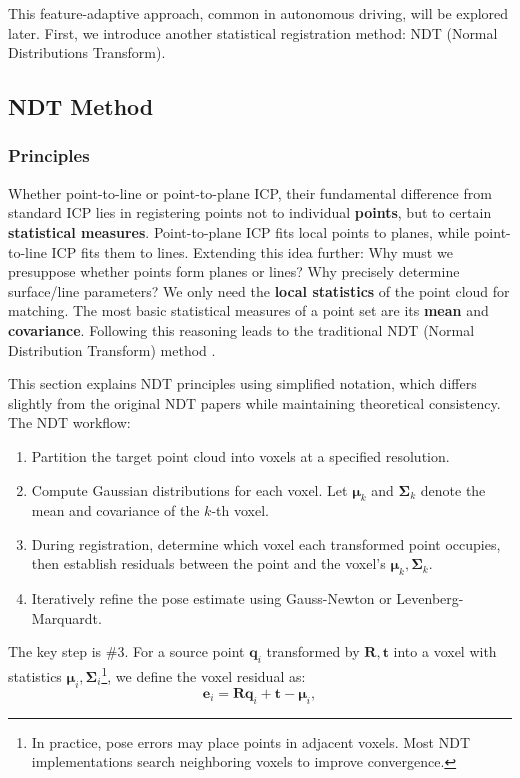 This feature-adaptive approach, common in autonomous driving, will be explored later. First, we introduce another statistical registration method: NDT (Normal Distributions Transform).

\subsection{NDT Method}
\label{sec:ndt}
\subsubsection{Principles}
Whether point-to-line or point-to-plane ICP, their fundamental difference from standard ICP lies in registering points not to individual \textbf{points}, but to certain \textbf{statistical measures}. Point-to-plane ICP fits local points to planes, while point-to-line ICP fits them to lines. Extending this idea further: Why must we presuppose whether points form planes or lines? Why precisely determine surface/line parameters? We only need the \textbf{local statistics} of the point cloud for matching. The most basic statistical measures of a point set are its \textbf{mean} and \textbf{covariance}. Following this reasoning leads to the traditional NDT (Normal Distribution Transform) method \cite{Ulas2013,Saarinen2013}.

This section explains NDT principles using simplified notation, which differs slightly from the original NDT papers while maintaining theoretical consistency. The NDT workflow:

\begin{enumerate}
	\item Partition the target point cloud into voxels at a specified resolution.
	\item Compute Gaussian distributions for each voxel. Let $\boldsymbol{\mu}_k$ and $\boldsymbol{\Sigma}_k$ denote the mean and covariance of the $k$-th voxel.
	\item During registration, determine which voxel each transformed point occupies, then establish residuals between the point and the voxel's $\boldsymbol{\mu}_k, \boldsymbol{\Sigma}_k$.
	\item Iteratively refine the pose estimate using Gauss-Newton or Levenberg-Marquardt.
\end{enumerate}

The key step is \#3. For a source point $\mathbf{q}_i$ transformed by $\mathbf{R}, \mathbf{t}$ into a voxel with statistics $\boldsymbol{\mu}_i, \boldsymbol{\Sigma}_i$\footnote{In practice, pose errors may place points in adjacent voxels. Most NDT implementations search neighboring voxels to improve convergence.}, we define the voxel residual as:
\begin{equation}\label{key}
	\mathbf{e}_i = \mathbf{R} \mathbf{q}_i + \mathbf{t} - \boldsymbol{\mu}_i,
\end{equation}

